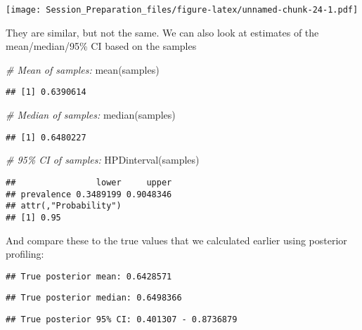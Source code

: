 \documentclass[
  12pt,
]{article}
\newenvironment{Shaded}{\begin{snugshade}}{\end{snugshade}}
\newcommand{\CommentTok}[1]{\textcolor[rgb]{0.56,0.35,0.01}{\textit{#1}}}
\newcommand{\FunctionTok}[1]{\textcolor[rgb]{0.00,0.00,0.00}{#1}}
\newcommand{\NormalTok}[1]{#1}
\begin{document}
\texttt{[image: Session\_Preparation\_files/figure-latex/unnamed-chunk-24-1.pdf]}

They are similar, but not the same. We can also look at estimates of the
mean/median/95\% CI based on the samples

\begin{Shaded}
\begin{Highlighting}[]
\CommentTok{\# Mean of samples:}
\FunctionTok{mean}\NormalTok{(samples)}
\end{Highlighting}
\end{Shaded}

\begin{verbatim}
## [1] 0.6390614
\end{verbatim}

\begin{Shaded}
\begin{Highlighting}[]
\CommentTok{\# Median of samples:}
\FunctionTok{median}\NormalTok{(samples)}
\end{Highlighting}
\end{Shaded}

\begin{verbatim}
## [1] 0.6480227
\end{verbatim}

\begin{Shaded}
\begin{Highlighting}[]
\CommentTok{\# 95\% CI of samples:}
\FunctionTok{HPDinterval}\NormalTok{(samples)}
\end{Highlighting}
\end{Shaded}

\begin{verbatim}
##                lower     upper
## prevalence 0.3489199 0.9048346
## attr(,"Probability")
## [1] 0.95
\end{verbatim}

And compare these to the true values that we calculated earlier using
posterior profiling:

\begin{verbatim}
## True posterior mean: 0.6428571
\end{verbatim}

\begin{verbatim}
## True posterior median: 0.6498366
\end{verbatim}

\begin{verbatim}
## True posterior 95% CI: 0.401307 - 0.8736879
\end{verbatim}
\end{document}

